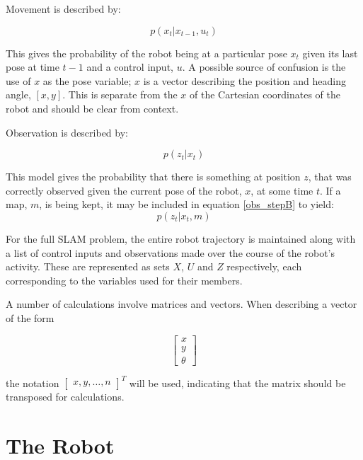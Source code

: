 \documentclass[12pt]{article}
\begin{document}
Movement is described by:

\begin{equation}\label{predict_stepB}
p(x_{t}|x_{t-1},u_{t})
\end{equation}

This gives the probability of the robot being at a particular pose $x_{t}$ given its last pose at time $t-1$ and a control input, $u$.  A possible source of confusion is the use of $x$ as the pose variable;  $x$ is a vector describing the position and heading angle, $[x,y]$. This is separate from the $x$ of the Cartesian coordinates of the robot and should be clear from context.  

Observation is described by:

\begin{equation}\label{obs_stepB}
p(z_{t}|x_{t})
\end{equation}
   
This model gives the probability that there is something at position $z$, that was correctly observed given the current pose of the robot, $x$, at some time $t$.  If a map, $m$, is being kept, it may be included in equation \ref{obs_stepB} to yield:
\begin{equation}\label{obs_step_mapB}
p(z_{t}|x_{t},m)
\end{equation}

For the full SLAM problem, the entire robot trajectory is maintained along with a list of control inputs and observations made over the course of the robot’s activity.  These are represented as sets $X$, $U$ and $Z$ respectively, each corresponding to the variables used for their members.   

A number of calculations involve matrices and vectors.  When describing a vector of the form

\[
\left[ {\begin{array}{cc}
 x \\
 y \\
\theta
\end{array} } \right]
\]

the notation $\left[ {\begin{array}{cc} x, y, \dots, n\end{array} }\right]^T$ will be used, indicating that the matrix should be transposed for calculations.  

\section{The Robot}
\end{document}
